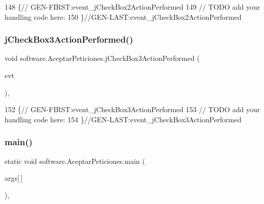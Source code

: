 \begin{DoxyCode}
148                                                                            \{\textcolor{comment}{//
      GEN-FIRST:event\_jCheckBox2ActionPerformed}
149         \textcolor{comment}{// TODO add your handling code here:}
150     \}\textcolor{comment}{//GEN-LAST:event\_jCheckBox2ActionPerformed}
\end{DoxyCode}
\mbox{\label{classsoftware_1_1_aceptar_peticiones_a62c8bfdd7cd94d40d2629a094e2e5252}} 
\subsubsection{\texorpdfstring{j\+Check\+Box3\+Action\+Performed()}{jCheckBox3ActionPerformed()}}
{\footnotesize\ttfamily void software.\+Aceptar\+Peticiones.\+j\+Check\+Box3\+Action\+Performed (\begin{DoxyParamCaption}\item[{java.\+awt.\+event.\+Action\+Event}]{evt }\end{DoxyParamCaption})\hspace{0.3cm}{\ttfamily [inline]}, {\ttfamily [private]}}


\begin{DoxyCode}
152                                                                            \{\textcolor{comment}{//
      GEN-FIRST:event\_jCheckBox3ActionPerformed}
153         \textcolor{comment}{// TODO add your handling code here:}
154     \}\textcolor{comment}{//GEN-LAST:event\_jCheckBox3ActionPerformed}
\end{DoxyCode}
\mbox{\label{classsoftware_1_1_aceptar_peticiones_a5d8c3817a4a49ecd69165720b24c209d}} 
\subsubsection{\texorpdfstring{main()}{main()}}
{\footnotesize\ttfamily static void software.\+Aceptar\+Peticiones.\+main (\begin{DoxyParamCaption}\item[{String}]{args\mbox{[}$\,$\mbox{]} }\end{DoxyParamCaption})\hspace{0.3cm}{\ttfamily [inline]}, {\ttfamily [static]}}


